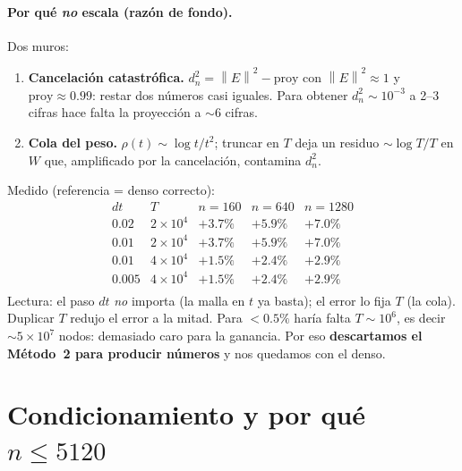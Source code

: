 \documentclass[11pt]{article}
\newcommand{\norm}[1]{\left\|#1\right\|}
\begin{document}
\paragraph{Por qu\'e \emph{no} escala (raz\'on de fondo).} Dos muros:
\begin{enumerate}[leftmargin=*]
  \item \textbf{Cancelaci\'on catastr\'ofica.} $d_n^2=\norm{E}^2-\text{proy}$ con
        $\norm{E}^2\approx1$ y $\text{proy}\approx0.99$: restar dos n\'umeros casi
        iguales. Para obtener $d_n^2\sim10^{-3}$ a 2--3 cifras hace falta la
        proyecci\'on a $\sim6$ cifras.
  \item \textbf{Cola del peso.} $\rho(t)\sim\log t/t^2$; truncar en $T$ deja un residuo
        $\sim\log T/T$ en $W$ que, amplificado por la cancelaci\'on, contamina $d_n^2$.
\end{enumerate}
Medido (referencia = denso correcto):
\[
\begin{array}{ll|ccc}
dt & T & n{=}160 & n{=}640 & n{=}1280\\
\hline
0.02 & 2\times10^4 & +3.7\% & +5.9\% & +7.0\%\\
0.01 & 2\times10^4 & +3.7\% & +5.9\% & +7.0\%\\
0.01 & 4\times10^4 & +1.5\% & +2.4\% & +2.9\%\\
0.005& 4\times10^4 & +1.5\% & +2.4\% & +2.9\%\\
\end{array}
\]
Lectura: el paso $dt$ \emph{no} importa (la malla en $t$ ya basta); el error lo fija
\emph{$T$} (la cola). Duplicar $T$ redujo el error a la mitad. Para $<0.5\%$ har\'ia falta
$T\sim10^6$, es decir $\sim5\times10^7$ nodos: demasiado caro para la ganancia. Por eso
\textbf{descartamos el M\'etodo~2 para producir n\'umeros} y nos quedamos con el denso.

\section{Condicionamiento y por qu\'e $n\le5120$}
\label{sec:cond}
\end{document}
